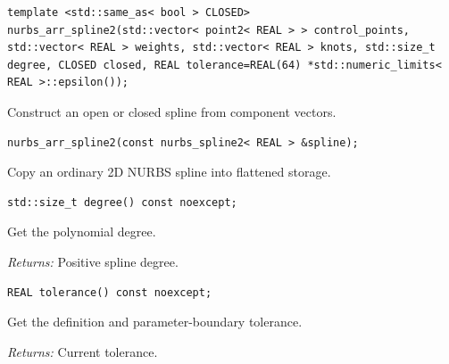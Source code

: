 \par\noindent\begin{minipage}{\linewidth}
\begin{lstlisting}[style=apireference]
template <std::same_as< bool > CLOSED>
nurbs_arr_spline2(std::vector< point2< REAL > > control_points, std::vector< REAL > weights, std::vector< REAL > knots, std::size_t degree, CLOSED closed, REAL tolerance=REAL(64) *std::numeric_limits< REAL >::epsilon());
\end{lstlisting}
{\footnotesize Construct an open or closed spline from component vectors.\par}
\end{minipage}\par\vspace{1pt}
\par\noindent\begin{minipage}{\linewidth}
\begin{lstlisting}[style=apireference]
nurbs_arr_spline2(const nurbs_spline2< REAL > &spline);
\end{lstlisting}
{\footnotesize Copy an ordinary 2D NURBS spline into flattened storage.\par}
\end{minipage}\par\vspace{1pt}
\par\noindent\begin{minipage}{\linewidth}
\begin{lstlisting}[style=apireference]
std::size_t degree() const noexcept;
\end{lstlisting}
{\footnotesize Get the polynomial degree.\par}
{\footnotesize\textit{Returns:} Positive spline degree.\par}
\end{minipage}\par\vspace{1pt}
\par\noindent\begin{minipage}{\linewidth}
\begin{lstlisting}[style=apireference]
REAL tolerance() const noexcept;
\end{lstlisting}
{\footnotesize Get the definition and parameter-boundary tolerance.\par}
{\footnotesize\textit{Returns:} Current tolerance.\par}
\end{minipage}\par\vspace{1pt}
